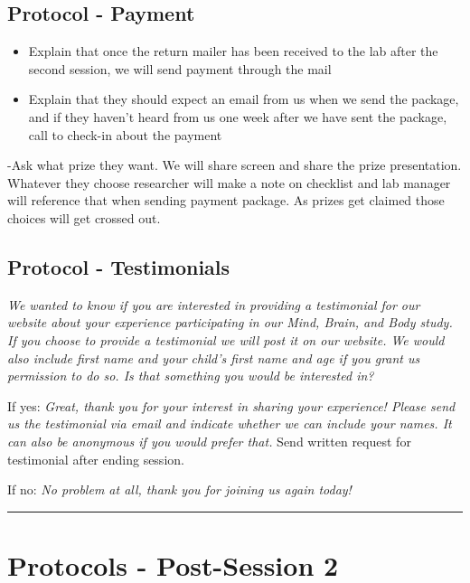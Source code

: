 \documentclass[]{book}
\begin{document}
\hypertarget{protocol---payment-2}{%
\subsection{Protocol - Payment}\label{protocol---payment-2}}

\begin{itemize}
\item
  Explain that once the return mailer has been received to the lab after the second session, we will send payment through the mail
\item
  Explain that they should expect an email from us when we send the package, and if they haven't heard from us one week after we have sent the package, call to check-in about the payment
\end{itemize}

-Ask what prize they want. We will share screen and share the prize presentation. Whatever they choose researcher will make a note on checklist and lab manager will reference that when sending payment package. As prizes get claimed those choices will get crossed out.

\hypertarget{protocol---testimonials-1}{%
\subsection{Protocol - Testimonials}\label{protocol---testimonials-1}}

\emph{We wanted to know if you are interested in providing a testimonial for our website about your experience participating in our Mind, Brain, and Body study. If you choose to provide a testimonial we will post it on our website. We would also include first name and your child's first name and age if you grant us permission to do so. Is that something you would be interested in?}

If yes: \emph{Great, thank you for your interest in sharing your experience! Please send us the testimonial via email and indicate whether we can include your names. It can also be anonymous if you would prefer that.} Send written request for testimonial after ending session.

If no: \emph{No problem at all, thank you for joining us again today!}

\begin{center}\rule{0.5\linewidth}{0.5pt}\end{center}

\hypertarget{protocols---post-session-2-1}{%
\section{Protocols - Post-Session 2}\label{protocols---post-session-2-1}}
\end{document}
